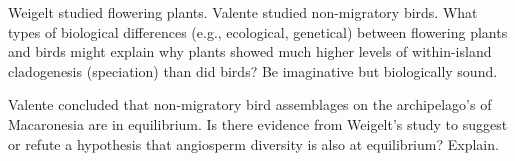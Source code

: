 \documentclass[11pt, addpoints]{exam}
\begin{document}
\begin{questions}
%
\else{}
\fi


\question[5]
Weigelt studied flowering plants. Valente studied non-migratory birds. What types of biological differences (e.g., ecological, genetical) between flowering plants and birds might explain why plants showed much higher levels of within-island cladogenesis (speciation) than did birds? Be imaginative but biologically sound.

%
\else{}
\fi


\question[5]
Valente concluded that non-migratory bird assemblages on the archipelago's of Macaronesia are in equilibrium. 
Is there evidence from Weigelt's study to suggest or refute a hypothesis that angiosperm diversity is also at equilibrium? Explain.

%
\else{}
\fi



\end{questions}
\end{document}
